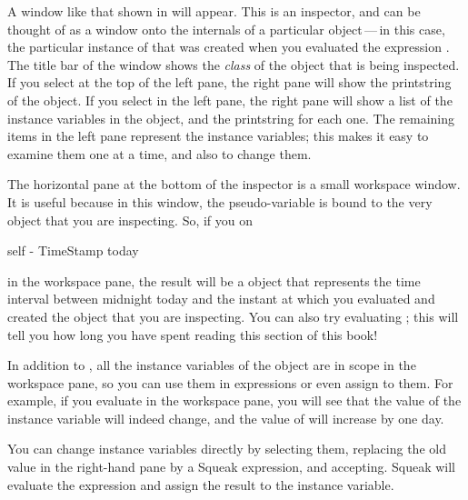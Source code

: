 \documentclass[a4paper,10pt,twoside]{book}
\begin{document}
A window like that shown in  will appear.   
This is an inspector, and can be thought of as a window onto the internals of a particular object\,---\,in this case, the particular instance of \mbox{} 
that was created when you evaluated the expression .
The title bar of the window shows the \emph{class} of the object that is being inspected.
If you select  at the top of the left pane, the right pane will show the printstring of the object.
If you select  in the left pane, the right pane will show a list of the instance variables in the object, and the printstring for each one.  
The remaining items in the left pane represent the instance variables; this makes it easy to examine them one at a time, and also to change them.

The horizontal pane at the bottom of the inspector is a small workspace window.  It is useful because in this window, the pseudo-variable  is bound to the very object that you are inspecting.  
So, if you  on
\begin{code}{}
self - TimeStamp today
\end{code}
in the workspace pane, the result will be a  object that represents the time interval between midnight today and the instant at which you evaluated   and created the  object that you are inspecting.
You can also try evaluating ; this will tell you how long you have spent reading this section of this book!

In addition to , all the instance variables of the object are in scope in the workspace pane, so you can use them in expressions or even assign to them.  For example, if you evaluate  in the workspace pane, you will see that the value of the  instance variable will indeed change, and the value of  will increase by one day.

You can change instance variables directly by selecting them, replacing the old value in the right-hand  pane by a Squeak expression, and accepting.  
Squeak will evaluate the expression and assign the result to the instance variable.
\end{document}
